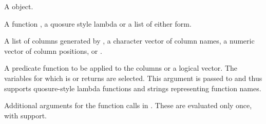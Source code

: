 \documentclass[a4paper]{book}
\begin{document}
%
\begin{Arguments}
\begin{ldescription}
\item[\code{.tbl}] A  object.

\item[\code{.funs}] A function , a quosure style lambda  or a list of either form.

\item[\code{.vars}] A list of columns generated by ,
a character vector of column names, a numeric vector of column
positions, or .

\item[\code{.predicate}] A predicate function to be applied to the columns
or a logical vector. The variables for which  is or
returns  are selected. This argument is passed to
 and thus supports quosure-style lambda
functions and strings representing function names.

\item[\code{...}] Additional arguments for the function calls in
. These are evaluated only once, with  support.
\end{ldescription}
\end{Arguments}
%
\end{document}
